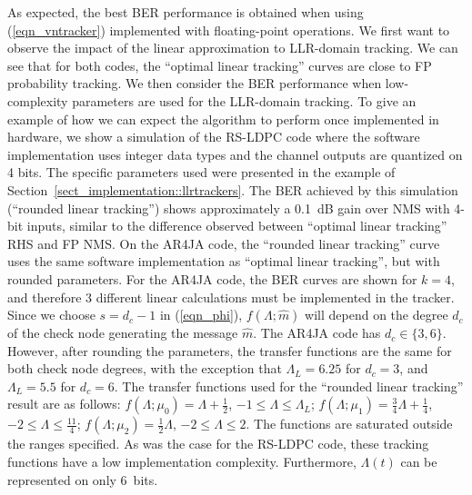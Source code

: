 \documentclass[12pt,journal,twoside,draftcls,onecolumn]{IEEEtran}
\begin{document}
As expected, the best BER performance is obtained when using (\ref{eqn_vntracker}) implemented with floating-point operations. We first want to observe the impact of the linear approximation to LLR-domain tracking. We can see that for both codes, the ``optimal linear tracking'' curves are close to FP probability tracking. 
We then consider the BER performance when low-complexity parameters are used for the LLR-domain tracking. To give an example of how we can expect the algorithm to perform once implemented in hardware, we show a simulation of the RS-LDPC code where the software implementation uses integer data types and the channel outputs are quantized on 4 bits. The specific parameters used were presented in the example of Section~\ref{sect_implementation::llrtrackers}. The BER achieved by this simulation (``rounded linear tracking'') shows approximately a 0.1~dB gain over NMS with 4-bit inputs, similar to the difference observed between ``optimal linear tracking'' RHS and FP NMS.
On the AR4JA code, the ``rounded linear tracking'' curve uses the same software implementation as ``optimal linear tracking'', but with rounded parameters. For the AR4JA code, the BER curves are shown for $k=4$, and therefore 3 different linear calculations must be implemented in the tracker. 
Since we choose $s=d_c-1$ in (\ref{eqn_phi}), $f(\Lambda; \hat{m})$ will depend on the degree $d_c$ of the check node generating the message $\hat{m}$. 
The AR4JA code has $d_c \in \{3, 6\}$. However, after rounding the parameters, the transfer functions are the same for both check node degrees, with the exception that $\Lambda_L = 6.25$ for $d_c=3$, and $\Lambda_L = 5.5$ for $d_c=6$. The transfer functions used for the ``rounded linear tracking'' result are as follows:
$f(\Lambda; \mu_0) = \Lambda + \frac{1}{2}$, $-1 \leq \Lambda \leq \Lambda_L$;
$f(\Lambda; \mu_1) = \frac{3}{4} \Lambda + \frac{1}{4}$, $-2 \leq \Lambda \leq \frac{11}{4}$;
$f(\Lambda; \mu_2) = \frac{1}{2} \Lambda$, $-2 \leq \Lambda \leq 2$.
The functions are saturated outside the ranges specified. As was the case for the RS-LDPC code, these tracking functions have a low implementation complexity. Furthermore, $\Lambda(t)$ can be represented on only 6~bits.
\end{document}
